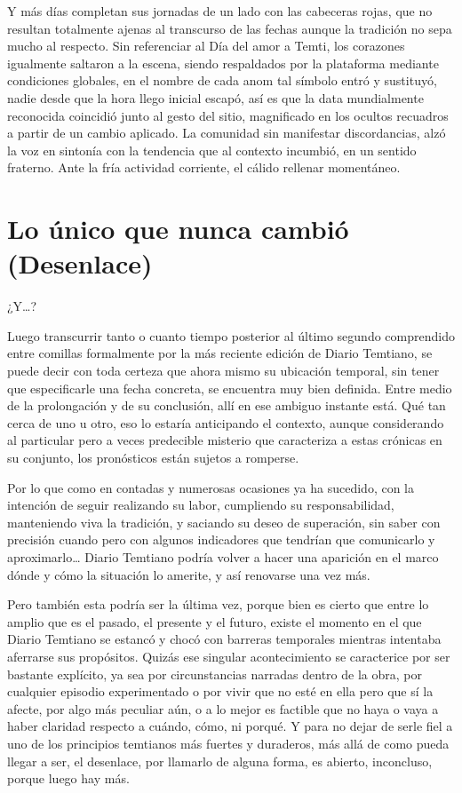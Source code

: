 \documentclass[
]{book}
\begin{document}
Y más días completan sus jornadas de un lado con las cabeceras rojas, que no resultan totalmente ajenas al transcurso de las fechas aunque la tradición no sepa mucho al respecto. Sin referenciar al Día del amor a Temti, los corazones igualmente saltaron a la escena, siendo respaldados por la plataforma mediante condiciones globales, en el nombre de cada anom tal símbolo entró y sustituyó, nadie desde que la hora llego inicial escapó, así es que la data mundialmente reconocida coincidió junto al gesto del sitio, magnificado en los ocultos recuadros a partir de un cambio aplicado. La comunidad sin manifestar discordancias, alzó la voz en sintonía con la tendencia que al contexto incumbió, en un sentido fraterno. Ante la fría actividad corriente, el cálido rellenar momentáneo.

\hypertarget{lo-uxfanico-que-nunca-cambiuxf3-desenlace}{%
\chapter{Lo único que nunca cambió (Desenlace)}\label{lo-uxfanico-que-nunca-cambiuxf3-desenlace}}

¿Y\ldots?

Luego transcurrir tanto o cuanto tiempo posterior al último segundo comprendido entre comillas formalmente por la más reciente edición de Diario Temtiano, se puede decir con toda certeza que ahora mismo su ubicación temporal, sin tener que especificarle una fecha concreta, se encuentra muy bien definida. Entre medio de la prolongación y de su conclusión, allí en ese ambiguo instante está. Qué tan cerca de uno u otro, eso lo estaría anticipando el contexto, aunque considerando al particular pero a veces predecible misterio que caracteriza a estas crónicas en su conjunto, los pronósticos están sujetos a romperse.

Por lo que como en contadas y numerosas ocasiones ya ha sucedido, con la intención de seguir realizando su labor, cumpliendo su responsabilidad, manteniendo viva la tradición, y saciando su deseo de superación, sin saber con precisión cuando pero con algunos indicadores que tendrían que comunicarlo y aproximarlo\ldots{} Diario Temtiano podría volver a hacer una aparición en el marco dónde y cómo la situación lo amerite, y así renovarse una vez más.

Pero también esta podría ser la última vez, porque bien es cierto que entre lo amplio que es el pasado, el presente y el futuro, existe el momento en el que Diario Temtiano se estancó y chocó con barreras temporales mientras intentaba aferrarse sus propósitos. Quizás ese singular acontecimiento se caracterice por ser bastante explícito, ya sea por circunstancias narradas dentro de la obra, por cualquier episodio experimentado o por vivir que no esté en ella pero que sí la afecte, por algo más peculiar aún, o a lo mejor es factible que no haya o vaya a haber claridad respecto a cuándo, cómo, ni porqué. Y para no dejar de serle fiel a uno de los principios temtianos más fuertes y duraderos, más allá de como pueda llegar a ser, el desenlace, por llamarlo de alguna forma, es abierto, inconcluso, porque luego hay más.
\end{document}
